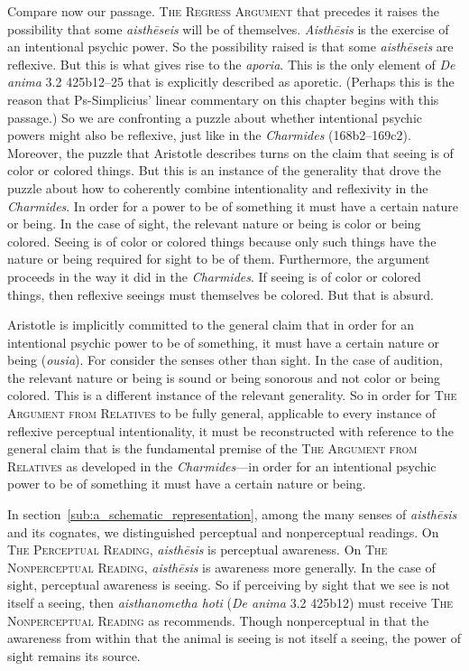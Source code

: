 
Compare now our passage. \textsc{The Regress Argument} that precedes it raises the possibility that some \emph{aisthēseis} will be of themselves. \emph{Aisthēsis} is the exercise of an intentional psychic power. So the possibility raised is that some \emph{aisthēseis} are reflexive. But this is what gives rise to the \emph{aporia}. This is the only element of \emph{De anima} 3.2 425b12–25 that is explicitly described as aporetic. (Perhaps this is the reason that Ps-Simplicius' linear commentary on this chapter begins with this passage.) So we are confronting a puzzle about whether intentional psychic powers might also be reflexive, just like in the \emph{Charmides} (168b2–169c2). Moreover, the puzzle that Aristotle describes turns on the claim that seeing is of color or colored things. But this is an instance of the generality that drove the puzzle about how to coherently combine intentionality and reflexivity in the \emph{Charmides}. In order for a power to be of something it must have a certain nature or being. In the case of sight, the relevant nature or being is color or being colored. Seeing is of color or colored things because only such things have the nature or being required for sight to be of them. Furthermore, the argument proceeds in the way it did in the \emph{Charmides}. If seeing is of color or colored things, then reflexive seeings must themselves be colored. But that is absurd.

Aristotle is implicitly committed to the general claim that in order for an intentional psychic power to be of something, it must have a certain nature or being (\emph{ousia}). For consider the senses other than sight. In the case of audition, the relevant nature or being is sound or being sonorous and not color or being colored. This is a different instance of the relevant generality. So in order for \textsc{The Argument from Relatives} to be fully general, applicable to every instance of reflexive perceptual intentionality, it must be reconstructed with reference to the general claim that is the fundamental premise of the \textsc{The Argument from Relatives} as developed in the \emph{Charmides}—in order for an intentional psychic power to be of something it must have a certain nature or being.

In section~\ref{sub:a_schematic_representation}, among the many senses of \emph{aisthēsis} and its cognates, we distinguished perceptual and nonperceptual readings. On \textsc{The Perceptual Reading}, \emph{aisthēsis} is perceptual awareness. On \textsc{The Nonperceptual Reading}, \emph{aisthēsis} is awareness more generally. In the case of sight, perceptual awareness is seeing. So if perceiving by sight that we see is not itself a seeing, then \emph{aisthanometha hoti} (\emph{De anima} 3.2 425b12) must receive \textsc{The Nonperceptual Reading} as \citet[265–6]{Shields:2016ix} recommends. Though nonperceptual in that the awareness from within that the animal is seeing is not itself a seeing, the power of sight remains its source.

